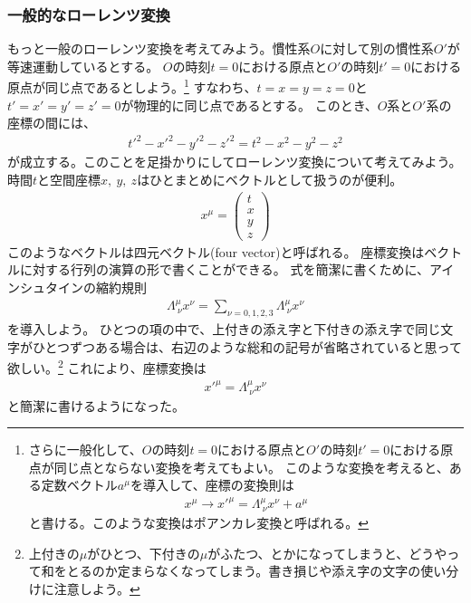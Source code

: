 \documentclass[10pt,a4paper]{jarticle}
\begin{document}
\subsubsection{一般的なローレンツ変換}
もっと一般のローレンツ変換を考えてみよう。慣性系$O$に対して別の慣性系$O'$が等速運動しているとする。
$O$の時刻$t=0$における原点と$O'$の時刻$t'=0$における原点が同じ点であるとしよう。\footnote{
さらに一般化して、$O$の時刻$t=0$における原点と$O'$の時刻$t'=0$における原点が同じ点とならない変換を考えてもよい。
このような変換を考えると、ある定数ベクトル$a^\mu$を導入して、座標の変換則は
\begin{align}
x^\mu \to x'^\mu = \Lambda^\mu_{~\nu} x^\nu + a^\mu
\end{align}
と書ける。このような変換はポアンカレ変換と呼ばれる。}
すなわち、$t=x=y=z=0$と$t'=x'=y'=z'=0$が物理的に同じ点であるとする。
このとき、$O$系と$O'$系の座標の間には、
\begin{align}
t'^2 - x'^2 - y'^2 - z'^2 = t^2 - x^2 - y^2 - z^2 \label{eq:lorentz invariance}
\end{align}
が成立する。このことを足掛かりにしてローレンツ変換について考えてみよう。
時間$t$と空間座標$x,~y,~z$はひとまとめにベクトルとして扱うのが便利。
\begin{align}
x^\mu = \left(\begin{array}{c}
t\\
x\\
y\\
z
\end{array}\right)
\end{align}
このようなベクトルは四元ベクトル(four vector)と呼ばれる。
%
座標変換はベクトルに対する行列の演算の形で書くことができる。
式を簡潔に書くために、アインシュタインの縮約規則
\begin{align}
\Lambda^\mu_{~\nu}x^\nu
=
\sum_{\nu=0,1,2,3} \Lambda^\mu_{~\nu}x^\nu
\end{align}
を導入しよう。
ひとつの項の中で、上付きの添え字と下付きの添え字で同じ文字がひとつずつある場合は、右辺のような総和の記号が省略されていると思って欲しい。\footnote{上付きの$\mu$がひとつ、下付きの$\mu$がふたつ、とかになってしまうと、どうやって和をとるのか定まらなくなってしまう。書き損じや添え字の文字の使い分けに注意しよう。}
これにより、座標変換は
\begin{align}
x'^{\mu} = \Lambda^\mu_{~\nu}x^\nu \label{eq:coordinate transf}
\end{align}
と簡潔に書けるようになった。
\end{document}
